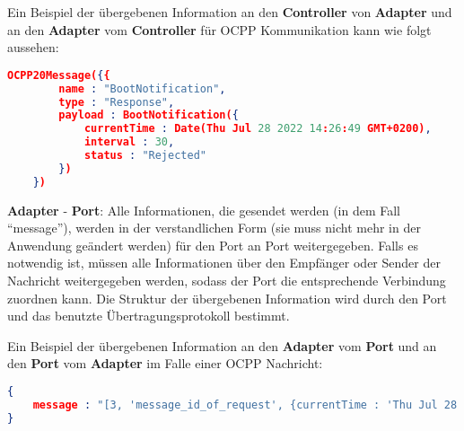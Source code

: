 \noindent Ein Beispiel der übergebenen Information an den \textbf{Controller} von \textbf{Adapter} 
und an den \textbf{Adapter} vom \textbf{Controller} für OCPP Kommunikation kann wie folgt aussehen:
\begin{lstlisting}[language=json,firstnumber=1]
    OCPP20Message({{
        name : "BootNotification",
        type : "Response",
        payload : BootNotification({
            currentTime : Date(Thu Jul 28 2022 14:26:49 GMT+0200),
            interval : 30,
            status : "Rejected"    
        })
    })
\end{lstlisting}

\noindent \textbf{Adapter} - \textbf{Port}: Alle Informationen, 
die gesendet werden (in dem Fall ``message''), werden in der verstandlichen Form (sie muss nicht mehr in der Anwendung geändert werden)
für den Port an Port weitergegeben.
Falls es notwendig ist, müssen alle Informationen über den Empfänger oder Sender der Nachricht weitergegeben werden, 
sodass der Port die entsprechende Verbindung zuordnen kann. 
Die Struktur der übergebenen Information wird durch den Port und das benutzte Übertragungsprotokoll bestimmt. 

\noindent Ein Beispiel der übergebenen Information an den \textbf{Adapter} vom \textbf{Port} 
und an den \textbf{Port} vom \textbf{Adapter} im Falle einer OCPP Nachricht:
\begin{lstlisting}[language=json,firstnumber=1]
{
    message : "[3, 'message_id_of_request', {currentTime : 'Thu Jul 28 2022 14:26:49Z', interval : 30, status : 'Rejected'}]"
}
\end{lstlisting}